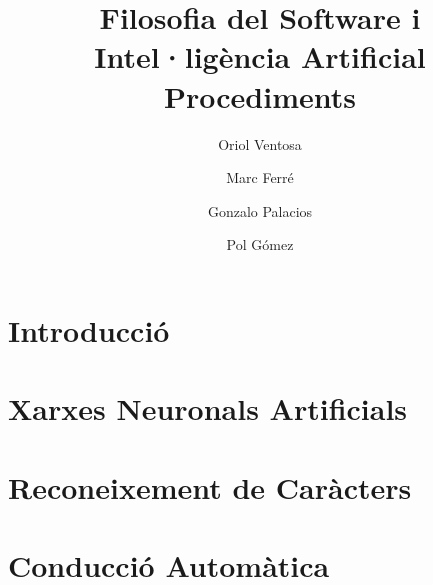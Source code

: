 \documentclass[a4paper,12pt]{report}
\date{}
\begin{document}


\title{
	{\bf Filosofia del Software i Intel·ligència Artificial} \\
	Procediments
}
\author{
	Oriol Ventosa \and
	Marc Ferré \and
	Gonzalo Palacios \and
	Pol Gómez
}

\maketitle

\tableofcontents

\chapter{Introducció}


\chapter{Xarxes Neuronals Artificials}


\chapter{Reconeixement de Caràcters}


\chapter{Conducció Automàtica}


%

\printbibliography
\end{document}
